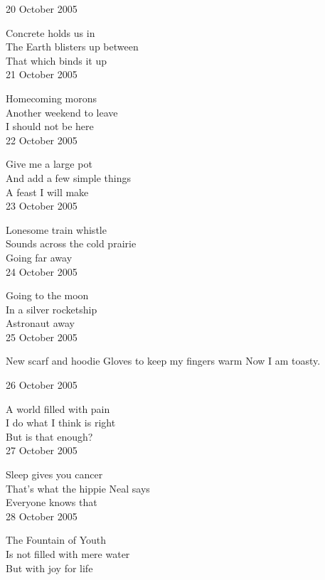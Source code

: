 \documentclass[12pt]{article}
\begin{document}
\newpage

20 October 2005

Concrete holds us in \\
The Earth blisters up between \\
That which binds it up \\

21 October 2005

Homecoming morons \\
Another weekend to leave \\
I should not be here \\

22 October 2005

Give me a large pot \\
And add a few simple things \\
A feast I will make \\

23 October 2005

Lonesome train whistle \\
Sounds across the cold prairie \\
Going far away \\

24 October 2005

Going to the moon \\
In a silver rocketship \\
Astronaut away \\

25 October 2005

New scarf and hoodie
Gloves to keep my fingers warm
Now I am toasty. \\

\newpage

26 October 2005

A world filled with pain \\
I do what I think is right \\
But is that enough? \\

27 October 2005

Sleep gives you cancer \\
That's what the hippie Neal says \\
Everyone knows that \\

28 October 2005

The Fountain of Youth \\
Is not filled with mere water  \\
But with joy for life \\
\end{document}
